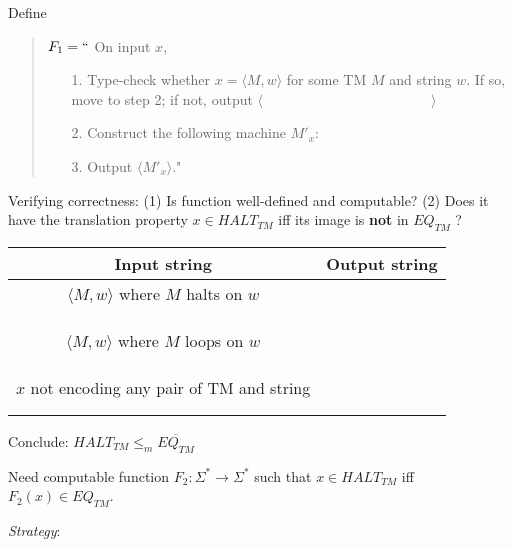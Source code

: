 \documentclass[12pt, oneside]{article}
\begin{document}
\vfill

Define

\vspace{-15pt}

\begin{quote}
$F_1 =  ``$ On input $x$,
\begin{itemize}
\item[1.] Type-check whether  $x = \langle M, w \rangle$ for some TM $M$ and string $w$. 
If so, move to step 2; if  not, output  $\langle \hspace{2in} \rangle$
\item[2.] Construct the following machine $M'_x$:
\vspace{50pt}
\item[3.] Output $\langle M'_x \rangle$."
\end{itemize}
\end{quote}

\vfill

Verifying correctness: (1) Is function well-defined and computable? (2) Does it have the 
translation property $x \in HALT_{TM}$ iff its image is {\bf not} in $EQ_{TM}$ ? 
\begin{center}
\begin{tabular}{|c|c|}
\hline
Input string &  Output string \\
\hline
$\langle M, w \rangle$ where  $M$ halts on $w$ & \phantom{\hspace{4in}} \\
& \\
& \\
& \\
$\langle M, w \rangle$ where $M$ loops on $w$ & \\
& \\
&\\ & \\
$x$ not encoding any pair of  TM and string   &  \\
& \\
& \\
\hline
\end{tabular}
\end{center}


\vfill

Conclude: $HALT_{TM} \leq_m \overline{EQ_{TM}}$
\newpage

\newpage 
Need computable function  $F_2: \Sigma^* \to \Sigma^*$  such that  $x \in HALT_{TM}$ iff 
$F_2(x)  \in  EQ_{TM}$.



{\it Strategy}:
\end{document}
